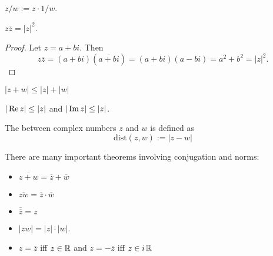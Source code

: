 \begin{definition}
    $z/w := z \cdot 1/w$.
\end{definition}

\begin{theorem}
    $z\overline{z} = |z|^2$.
\end{theorem}
\begin{proof}
    Let $z = a+bi$.  Then
    \[ z\overline{z} = (a+bi)(\overline{a+bi}) = (a+bi)(a-bi)
    = a^2 + b^2 = |z|^2. \]
\end{proof}

\begin{theorem}
$    |z + w| \le |z| + |w|$
\end{theorem}

\begin{cor}
    $|\operatorname{Re}{z}| \le |z|$ and $|\operatorname{Im}{z}| \le |z|$.
\end{cor}

\begin{definition}
    The  between complex numbers $z$ and $w$ is defined as
    \[ {\text{dist}}(z,w) := |z - w| \]
\end{definition}

\noindent
There are many important theorems involving conjugation and norms:
\begin{itemize}
    \item $\overline{z+w} = \overline{z} + \overline{w}$

    \item $\overline{zw} = \overline{z} \cdot \overline{w}$

    \item $\overline{\overline{z}} = z$

    \item $|zw| = |z| \cdot |w|$.

    \item $z = \overline{z}$ iff $z \in \operatorname{\mathbb{R}}$ and $z = -\overline{z}$ iff $z \in i\operatorname{\mathbb{R}}$
\end{itemize}




%

